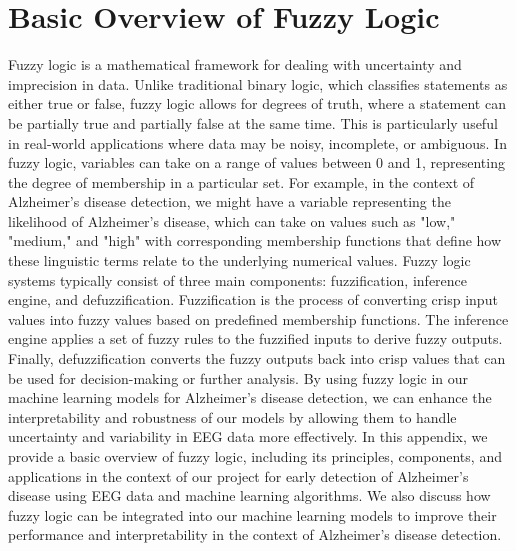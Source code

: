 \documentclass[openany]{book}
\begin{document}
\section{Basic Overview of Fuzzy Logic}
Fuzzy logic is a mathematical framework for dealing with uncertainty and imprecision in data. Unlike traditional binary logic, which classifies statements as either true or false, fuzzy logic allows for degrees of truth, where a statement can be partially true and partially false at the same time. This is particularly useful in real-world applications where data may be noisy, incomplete, or ambiguous. In fuzzy logic, variables can take on a range of values between 0 and 1, representing the degree of membership in a particular set. For example, in the context of Alzheimer's disease detection, we might have a variable representing the likelihood of Alzheimer's disease, which can take on values such as "low," "medium," and "high" with corresponding membership functions that define how these linguistic terms relate to the underlying numerical values. Fuzzy logic systems typically consist of three main components: fuzzification, inference engine, and defuzzification. Fuzzification is the process of converting crisp input values into fuzzy values based on predefined membership functions. The inference engine applies a set of fuzzy rules to the fuzzified inputs to derive fuzzy outputs. Finally, defuzzification converts the fuzzy outputs back into crisp values that can be used for decision-making or further analysis. By using fuzzy logic in our machine learning models for Alzheimer's disease detection, we can enhance the interpretability and robustness of our models by allowing them to handle uncertainty and variability in EEG data more effectively. In this appendix, we provide a basic overview of fuzzy logic, including its principles, components, and applications in the context of our project for early detection of Alzheimer's disease using EEG data and machine learning algorithms. We also discuss how fuzzy logic can be integrated into our machine learning models to improve their performance and interpretability in the context of Alzheimer's disease detection.
\end{document}

